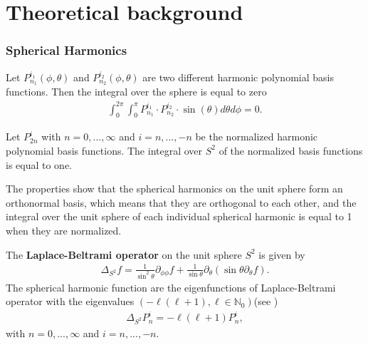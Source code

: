\section{Theoretical background}
\begin{frame}\frametitle{Spherical Harmonics}
	\small
		\begin{theorem}
			Let $P^{i_1}_{n_1}(\phi, \theta)$ and $P^{i_2}_{n_2}(\phi, \theta)$ are two different harmonic polynomial basis functions. Then the integral over the sphere is equal to zero
			\begin{align*}
				\int_{0}^{2\pi} \int_{0}^{\pi} P^{i_1}_{n_1} \cdot P^{i_2}_{n_2} \cdot \sin(\theta) d\theta d\phi = 0.
			\end{align*}
		\end{theorem}

		\begin{theorem}
			Let $P^i_{2n}$ with $n = 0, ..., \infty$ and $i = n, ..., -n$ be the normalized harmonic polynomial basis functions. The integral over $S^2$ of the normalized basis functions is equal to one.
		\end{theorem}

	The properties show that the spherical harmonics on the unit sphere form an orthonormal basis, which means that they are orthogonal to each other, and the integral over the unit sphere of each individual spherical harmonic is equal to 1 when they are normalized.
\end{frame}

\begin{frame}
	\begin{definition}
		The \textbf{Laplace-Beltrami operator} on the unit sphere $S^2$ is given by
		\begin{align*}
			\Delta_{S^2} f = \frac{1}{\sin ^2 \theta} \partial_{\phi \phi} f + \frac{1}{\sin \theta} \partial_\theta\left(\sin \theta \partial_\theta f\right).
		\end{align*}
		The spherical harmonic function are the eigenfunctions of Laplace-Beltrami operator with the eigenvalues $(- \ell (\ell +1),\ell \in \mathbb{N}_0)$(see \cite{zbMATH01218597})
		\begin{align*}
			\Delta_{S^2}P^i_n = -\ell(\ell+1) P^i_n,
		\end{align*}
		with $n = 0, ..., \infty$ and $i = n ,..., -n$.
	\end{definition}
\end{frame}

